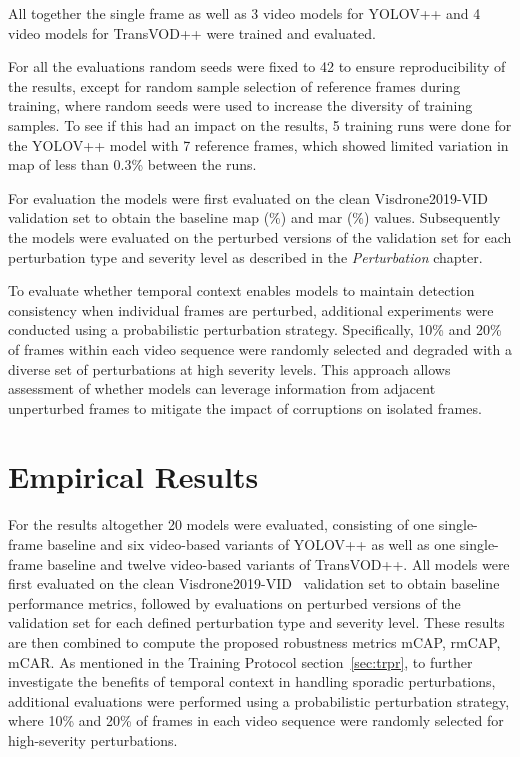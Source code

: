 \documentclass[final,twoside]{vutinfth}
\begin{document}
All together the single frame as well as 3 video models for YOLOV++ and 4 video models for TransVOD++ were trained and evaluated.

For all the evaluations random seeds were fixed to 42 to ensure reproducibility of the results, except for random sample selection of reference frames during training, where random seeds were used to increase the diversity of training samples.
To see if this had an impact on the results, 5 training runs were done for the YOLOV++ model with 7 reference frames, which showed limited variation in \gls{map} of less than 0.3\% between the runs.

For evaluation the models were first evaluated on the clean Visdrone2019-VID~\cite{zhu2021detection} validation set to obtain the baseline \gls{map} (\%) and \gls{mar} (\%) values.
Subsequently the models were evaluated on the perturbed versions of the validation set for each perturbation type and severity level as described in the \emph{Perturbation} chapter.

To evaluate whether temporal context enables models to maintain detection consistency when individual frames are perturbed, additional experiments were conducted using a probabilistic perturbation strategy. Specifically, 10\% and 20\% of frames within each video sequence were randomly selected and degraded with a diverse set of perturbations at high severity levels. This approach allows assessment of whether models can leverage information from adjacent unperturbed frames to mitigate the impact of corruptions on isolated frames.
\chapter{Empirical Results}
For the results altogether 20 models were evaluated, consisting of one single-frame baseline and six video-based variants of YOLOV++ as well as one single-frame baseline and twelve video-based variants of TransVOD++.
All models were first evaluated on the clean Visdrone2019-VID~\cite{zhu2021detection} validation set to obtain baseline performance metrics, followed by evaluations on perturbed versions of the validation set for each defined perturbation type and severity level.
These results are then combined to compute the proposed robustness metrics mCAP, rmCAP, mCAR.
As mentioned in the Training Protocol section~\ref{sec:trpr}, to further investigate the benefits of temporal context in handling sporadic perturbations, additional evaluations were performed using a probabilistic perturbation strategy, where 10\% and 20\% of frames in each video sequence were randomly selected for high-severity perturbations.
\end{document}
